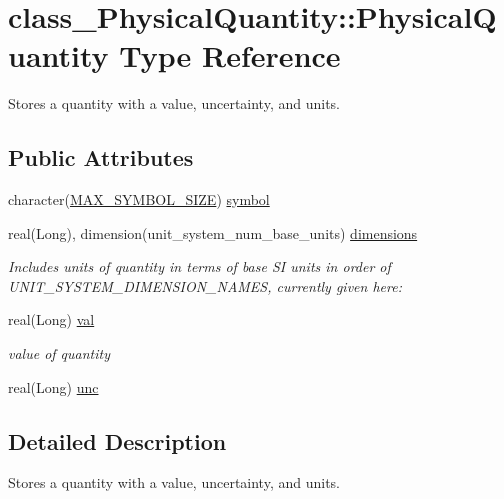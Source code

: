 \hypertarget{typeclass__PhysicalQuantity_1_1PhysicalQuantity}{
\section{class\_\-PhysicalQuantity::PhysicalQuantity Type Reference}
\label{typeclass__PhysicalQuantity_1_1PhysicalQuantity}
}


Stores a quantity with a value, uncertainty, and units.  


\subsection*{Public Attributes}
\begin{DoxyCompactItemize}
\item 
character(\hyperlink{namespaceclass__PhysicalQuantity_a2870256032bca15f690a32ce1d1b6c52}{MAX\_\-SYMBOL\_\-SIZE}) \hyperlink{typeclass__PhysicalQuantity_1_1PhysicalQuantity_aeff76900f557015cca225673641d17e8}{symbol}
\item 
real(Long), dimension(unit\_\-system\_\-num\_\-base\_\-units) \hyperlink{typeclass__PhysicalQuantity_1_1PhysicalQuantity_a00edddafb9d19f2dfa9308fd03a4f46a}{dimensions}
\begin{DoxyCompactList}\small\item\em Includes units of quantity in terms of base SI units in order of UNIT\_\-SYSTEM\_\-DIMENSION\_\-NAMES, currently given here: \item\end{DoxyCompactList}\item 
real(Long) \hyperlink{typeclass__PhysicalQuantity_1_1PhysicalQuantity_ae362510ba84f98322e31cd40193a4d26}{val}
\begin{DoxyCompactList}\small\item\em value of quantity \item\end{DoxyCompactList}\item 
real(Long) \hyperlink{typeclass__PhysicalQuantity_1_1PhysicalQuantity_abb0c17659fe335d551d4e715b84e9743}{unc}
\end{DoxyCompactItemize}


\subsection{Detailed Description}
Stores a quantity with a value, uncertainty, and units. 

